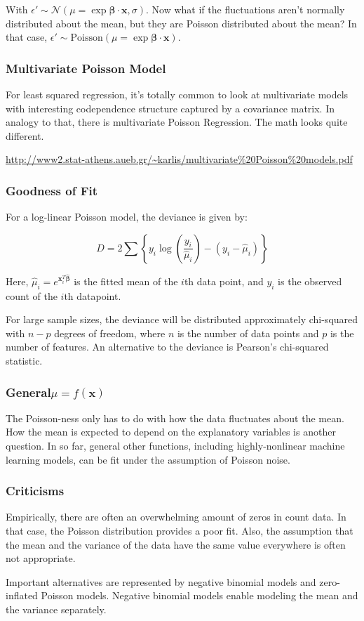 With $\epsilon' \sim \mathscr{N}(\mu = \exp{\mathbf{\beta \cdot x}},\sigma)$. Now what if the fluctuations aren't normally distributed about the mean, but they are Poisson distributed about the mean? In that case, $\epsilon' \sim \mathrm{Poisson}(\mu = \exp{\mathbf{\beta \cdot x}})$. 



\subsubsection{Multivariate Poisson Model}
For least squared regression, it's totally common to look at multivariate models with interesting codependence structure captured by a covariance matrix. In analogy to that, there is multivariate Poisson Regression. The math looks quite different. 

\url{http://www2.stat-athens.aueb.gr/~karlis/multivariate%20Poisson%20models.pdf}

\subsubsection{Goodness of Fit}
For a log-linear Poisson model, the deviance is given by:

\begin{equation}
D = 2\sum\left\{ y_i \log\left( \frac{y_i}{\hat{\mu}_i} \right) - \left( y_i - \hat{\mu}_i \right) \right\}
\end{equation}

Here, $\hat{\mu}_i = e^{\mathbf{x}^T_i \hat{\mathbf{\beta}}}$ is the fitted mean of the $i$th data point, and $y_i$ is the observed count of the $i$th datapoint. 

For large sample sizes, the deviance will be distributed approximately chi-squared with $n-p$ degrees of freedom, where $n$ is the number of data points and $p$ is the number of features. An alternative to the deviance is Pearson's chi-squared statistic. 

\subsubsection{General$\mu = f(\mathbf{x})$}
The Poisson-ness only has to do with how the data fluctuates about the mean. How the mean is expected to depend on the explanatory variables is another question. In so far, general other functions, including highly-nonlinear machine learning models, can be fit under the assumption of Poisson noise.


\subsubsection{Criticisms}

Empirically, there are often an overwhelming amount of zeros in count data. In that case, the Poisson distribution provides a poor fit. Also, the assumption that the mean and the variance of the data have the same value everywhere is often not appropriate. 

Important alternatives are represented by negative binomial models and zero-inflated Poisson models. Negative binomial models enable modeling the mean and the variance separately.
